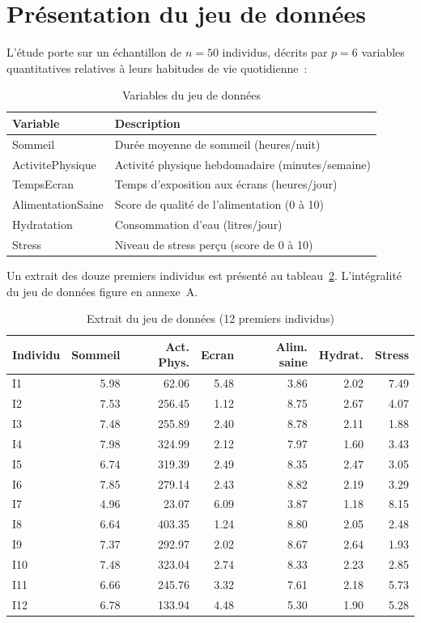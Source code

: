 \documentclass[11pt,a4paper,oneside]{book}
\begin{document}
\section{Présentation du jeu de données}

L'étude porte sur un échantillon de $n = 50$ individus, décrits par $p = 6$ variables quantitatives relatives à leurs habitudes de vie quotidienne~:

\begin{table}[h!]
\centering
\caption{Variables du jeu de données}
\label{tab:variables}
\begin{tabular}{@{}ll@{}}
\toprule
\textbf{Variable} & \textbf{Description} \\
\midrule
Sommeil & Durée moyenne de sommeil (heures/nuit) \\
ActivitePhysique & Activité physique hebdomadaire (minutes/semaine) \\
TempsEcran & Temps d'exposition aux écrans (heures/jour) \\
AlimentationSaine & Score de qualité de l'alimentation (0 à 10) \\
Hydratation & Consommation d'eau (litres/jour) \\
Stress & Niveau de stress perçu (score de 0 à 10) \\
\bottomrule
\end{tabular}
\end{table}

Un extrait des douze premiers individus est présenté au tableau~\ref{tab:extrait}. L'intégralité du jeu de données figure en annexe~A.

\begin{table}[h!]
\centering
\small
\caption{Extrait du jeu de données (12 premiers individus)}
\label{tab:extrait}
\begin{tabular}{@{}lrrrrrr@{}}
\toprule
\textbf{Individu} & \textbf{Sommeil} & \textbf{Act. Phys.} & \textbf{Ecran} & \textbf{Alim. saine} & \textbf{Hydrat.} & \textbf{Stress} \\
\midrule
I1  & 5.98 & 62.06  & 5.48 & 3.86 & 2.02 & 7.49 \\
I2  & 7.53 & 256.45 & 1.12 & 8.75 & 2.67 & 4.07 \\
I3  & 7.48 & 255.89 & 2.40 & 8.78 & 2.11 & 1.88 \\
I4  & 7.98 & 324.99 & 2.12 & 7.97 & 1.60 & 3.43 \\
I5  & 6.74 & 319.39 & 2.49 & 8.35 & 2.47 & 3.05 \\
I6  & 7.85 & 279.14 & 2.43 & 8.82 & 2.19 & 3.29 \\
I7  & 4.96 & 23.07  & 6.09 & 3.87 & 1.18 & 8.15 \\
I8  & 6.64 & 403.35 & 1.24 & 8.80 & 2.05 & 2.48 \\
I9  & 7.37 & 292.97 & 2.02 & 8.67 & 2.64 & 1.93 \\
I10 & 7.48 & 323.04 & 2.74 & 8.33 & 2.23 & 2.85 \\
I11 & 6.66 & 245.76 & 3.32 & 7.61 & 2.18 & 5.73 \\
I12 & 6.78 & 133.94 & 4.48 & 5.30 & 1.90 & 5.28 \\
\bottomrule
\end{tabular}
\end{table}
\end{document}
